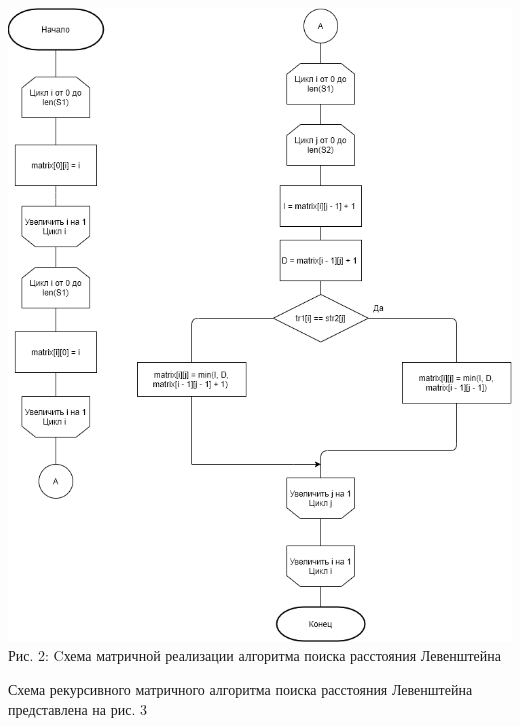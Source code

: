 \documentclass[12pt,a4paper]{article}
\begin{document}
\begin{center}	
	\includegraphics[width=.9\linewidth]{lev_matr}\\
	Рис. 2: Cхема матричной реализации алгоритма поиска расстояния Левенштейна
\end{center}
\clearpage
Схема рекурсивного матричного алгоритма поиска расстояния Левенштейна представлена на рис. 3
\end{document}
